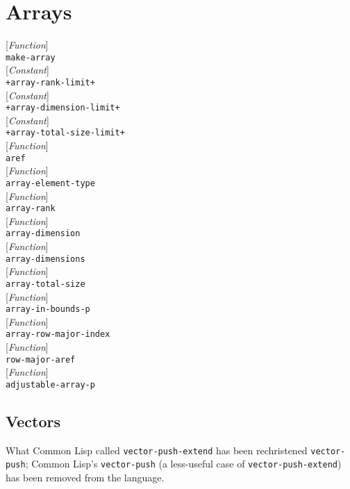\documentclass[10pt]{book}
\newenvironment{defother}[2]{[\textit{#1}]\\\texttt{#2}}{\\}
\newenvironment{defun}[1]{\begin{defother}{Function}{#1}}{\end{defother}}
\newenvironment{defconstant}[1]{\begin{defother}{Constant}{#1}}{\end{defother}}
\begin{document}
\chapter{Arrays}
\begin{defun}{make-array}\end{defun}
\begin{defconstant}{+array-rank-limit+}\end{defconstant} 
\begin{defconstant}{+array-dimension-limit+}\end{defconstant}
\begin{defconstant}{+array-total-size-limit+}\end{defconstant}
%
\begin{defun}{aref}\end{defun}
\begin{defun}{array-element-type}\end{defun}
\begin{defun}{array-rank}\end{defun}
\begin{defun}{array-dimension}\end{defun}
\begin{defun}{array-dimensions}\end{defun}
\begin{defun}{array-total-size}\end{defun}
\begin{defun}{array-in-bounds-p}\end{defun}
\begin{defun}{array-row-major-index}\end{defun}
\begin{defun}{row-major-aref}\end{defun}
\begin{defun}{adjustable-array-p}\end{defun}
\section{Vectors}

What Common Lisp called \texttt{vector-push-extend} has been rechristened \texttt{vector-push}; Common Lisp's \texttt{vector-push} (a less-useful case of \texttt{vector-push-extend}) has been removed from the language.
\end{document}
